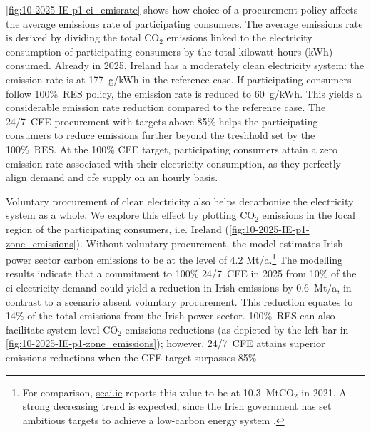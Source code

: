 \cref{fig:10-2025-IE-p1-ci_emisrate} shows how choice of a procurement policy affects the average emissions rate of participating consumers.
The average emissions rate is derived by dividing the total CO$_2$ emissions linked to the electricity consumption of participating consumers by the total kilowatt-hours (kWh) consumed.
Already in 2025, Ireland has a moderately clean electricity system: the emission rate is at 177~g\co/kWh in the reference case.
If participating consumers follow 100\%~RES policy, the emission rate is reduced to 60~g\co/kWh.
This yields a considerable emission rate reduction compared to the reference case.
The 24/7~CFE procurement with targets above 85\% helps the participating consumers to reduce emissions further beyond the treshhold set by the 100\%~RES. 
At the 100\% CFE target, participating consumers attain a zero emission rate associated with their electricity consumption, as they perfectly align demand and \gls{cfe} supply on an hourly basis.

Voluntary procurement of clean electricity also helps decarbonise the electricity system as a whole.
We explore this effect by plotting CO$_2$ emissions in the local region of the participating consumers, i.e. Ireland (\cref{fig:10-2025-IE-p1-zone_emissions}).
Without voluntary procurement, the model estimates Irish power sector carbon emissions to be at the level of 4.2 Mt\co/a.\footnote{For comparison, \href{https://www.seai.ie/data-and-insights/seai-statistics/key-publications/co2-emissions-report/}{seai.ie} reports this value to be at 10.3~MtCO$_2$ in 2021. A strong decreasing trend is expected, since the Irish government has set ambitious targets to achieve a low-carbon energy system \cite{seaiCOEmissionsReport2020}.}
The modelling results indicate that a commitment to 100\% 24/7~CFE in 2025 from 10\% of the \gls{ci} electricity demand could yield a reduction in Irish emissions by 0.6~Mt\co/a, in contrast to a scenario absent voluntary procurement. 
This reduction equates to 14\% of the total emissions from the Irish power sector.
100\%~RES can also facilitate system-level CO$_2$ emissions reductions (as depicted by the left bar in \cref{fig:10-2025-IE-p1-zone_emissions}); however, 24/7~CFE attains superior emissions reductions when the CFE target surpasses 85\%.

